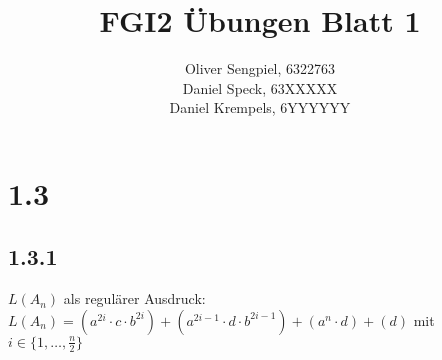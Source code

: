 \documentclass{article}
\title{FGI2 Übungen Blatt 1}
\author{Oliver Sengpiel, 6322763 \\
	Daniel Speck, 63XXXXX \\
	Daniel Krempels, 6YYYYYY}
\begin{document}
\maketitle

\section{1.3}
\subsection{1.3.1}
$L(A_n)$ als regulärer Ausdruck: \\
$L(A_n) = (a^{2i}\cdot c\cdot b^{2i}) + (a^{2i-1}\cdot d\cdot b^{2i-1}) +
(a^{n}\cdot d) + (d)$ mit $i \in \{1, \dots, \frac{n}{2} \}$
\end{document}
